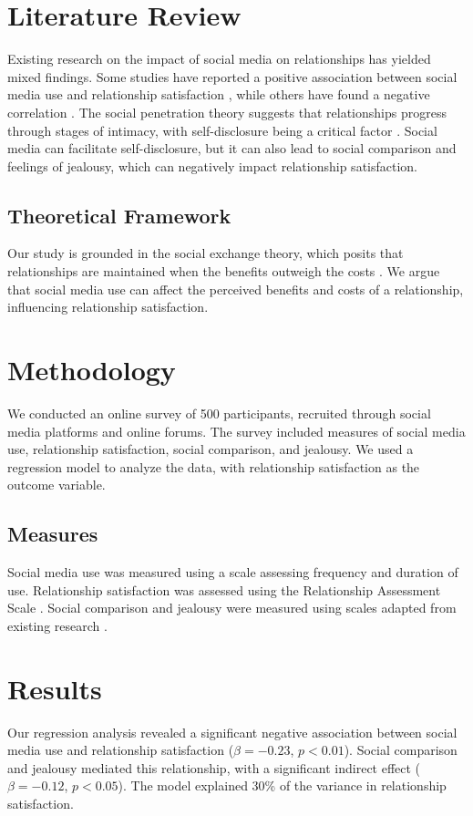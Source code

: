 \documentclass[12pt,a4paper]{article}
\begin{document}
\section{Literature Review}
Existing research on the impact of social media on relationships has yielded mixed findings. Some studies have reported a positive association between social media use and relationship satisfaction \citep{burke2010social}, while others have found a negative correlation \citep{király2019mental}. The social penetration theory suggests that relationships progress through stages of intimacy, with self-disclosure being a critical factor \citep{altman1973social}. Social media can facilitate self-disclosure, but it can also lead to social comparison and feelings of jealousy, which can negatively impact relationship satisfaction.

\subsection{Theoretical Framework}
Our study is grounded in the social exchange theory, which posits that relationships are maintained when the benefits outweigh the costs \citep{emerson1976social}. We argue that social media use can affect the perceived benefits and costs of a relationship, influencing relationship satisfaction.

\section{Methodology}
We conducted an online survey of 500 participants, recruited through social media platforms and online forums. The survey included measures of social media use, relationship satisfaction, social comparison, and jealousy. We used a regression model to analyze the data, with relationship satisfaction as the outcome variable.

\subsection{Measures}
Social media use was measured using a scale assessing frequency and duration of use. Relationship satisfaction was assessed using the Relationship Assessment Scale \citep{hendrick1988relationship}. Social comparison and jealousy were measured using scales adapted from existing research \citep{burke2010social}.

\section{Results}
Our regression analysis revealed a significant negative association between social media use and relationship satisfaction ($\beta = -0.23$, $p < 0.01$). Social comparison and jealousy mediated this relationship, with a significant indirect effect ($\beta = -0.12$, $p < 0.05$). The model explained 30\% of the variance in relationship satisfaction.
\end{document}
